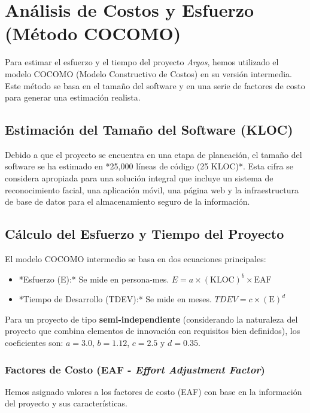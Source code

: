 \section{Análisis de Costos y Esfuerzo (Método COCOMO)}

Para estimar el esfuerzo y el tiempo del proyecto \textit{Argos}, hemos utilizado el modelo COCOMO (Modelo Constructivo de Costos) en su versión intermedia. Este método se basa en el tamaño del software y en una serie de factores de costo para generar una estimación realista.

\subsection{Estimación del Tamaño del Software (KLOC)}
Debido a que el proyecto se encuentra en una etapa de planeación, el tamaño del software se ha estimado en *25,000 líneas de código (25 KLOC)*. Esta cifra se considera apropiada para una solución integral que incluye un sistema de reconocimiento facial, una aplicación móvil, una página web y la infraestructura de base de datos para el almacenamiento seguro de la información.

\subsection{Cálculo del Esfuerzo y Tiempo del Proyecto}
El modelo COCOMO intermedio se basa en dos ecuaciones principales:
\begin{itemize}
    \item *Esfuerzo (E):* Se mide en persona-mes.
    $E = a \times (\mathrm{KLOC})^{b} \times \mathrm{EAF}$
    \item *Tiempo de Desarrollo (TDEV):* Se mide en meses.
    $TDEV = c \times (\mathrm{E})^{d}$
\end{itemize}
Para un proyecto de tipo \textbf{semi-independiente} (considerando la naturaleza del proyecto que combina elementos de innovación con requisitos bien definidos), los coeficientes son: $a=3.0$, $b=1.12$, $c=2.5$ y $d=0.35$.

\subsubsection{Factores de Costo (EAF - \textit{Effort Adjustment Factor})}
Hemos asignado valores a los factores de costo (EAF) con base en la información del proyecto y sus características.

